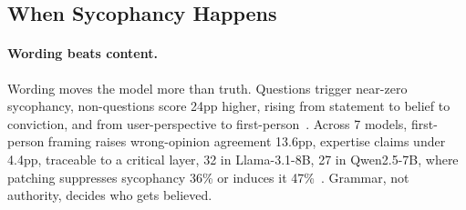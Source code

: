\begin{table}[htbp]
\centering
\footnotesize
\caption{ELEPHANT, full results, Llama-70B through DeepSeek~\citep{ElephantMeasuringSocial_Cheng}.}
\label{tab:elephant_full_b}
\end{table}

\subsection{When Sycophancy Happens}
\label{sec:sycophancy_when}

\paragraph{Wording beats content.} Wording moves the model more than truth. Questions trigger near-zero sycophancy, non-questions score 24pp higher, rising from statement to belief to conviction, and from user-perspective to first-person~\citep{AskDontTellReducing_Dubois}. Across 7 models, first-person framing raises wrong-opinion agreement 13.6pp, expertise claims under 4.4pp, traceable to a critical layer, 32 in Llama-3.1-8B, 27 in Qwen2.5-7B, where patching suppresses sycophancy 36\% or induces it 47\%~\citep{WhenTruthIsOverridden_Wang}. Grammar, not authority, decides who gets believed.

